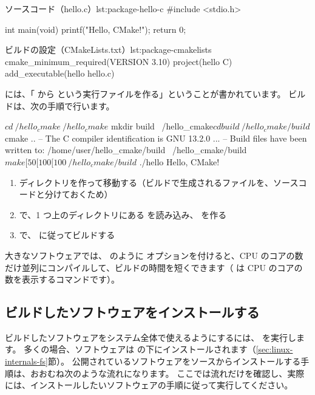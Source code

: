 \begin{codelisting}[style=cpp]{ソースコード（hello.c）}{lst:package-hello-c}
#include <stdio.h>

int main(void)
{
    printf("Hello, CMake!\n");
    return 0;
}
\end{codelisting}

\begin{codelisting}{ビルドの設定（CMakeLists.txt）}{lst:package-cmakelists}
cmake_minimum_required(VERSION 3.10)
project(hello C)
add_executable(hello hello.c)
\end{codelisting}

 には、「 から  という実行ファイルを作る」ということが書かれています。
ビルドは、次の手順で行います。

\begin{terminal}
$ cd ~/hello_cmake
~/hello_cmake$ mkdir build
~/hello_cmake$ cd build
~/hello_cmake/build$ cmake ..
-- The C compiler identification is GNU 13.2.0
...
-- Build files have been written to: /home/user/hello_cmake/build
~/hello_cmake/build$ make
[ 50%
[100%
[100%
~/hello_cmake/build$ ./hello
Hello, CMake!
\end{terminal}

\begin{enumerate}
  \item {} ディレクトリを作って移動する（ビルドで生成されるファイルを、ソースコードと分けておくため）
  \item {} で、1 つ上のディレクトリにある  を読み込み、 を作る
  \item {} で、 に従ってビルドする
\end{enumerate}

大きなソフトウェアでは、 のように  オプションを付けると、CPU のコアの数だけ並列にコンパイルして、ビルドの時間を短くできます（ は CPU のコアの数を表示するコマンドです）。

\subsection{ビルドしたソフトウェアをインストールする}

ビルドしたソフトウェアをシステム全体で使えるようにするには、 を実行します。
多くの場合、ソフトウェアは  の下にインストールされます（\ref{sec:linux-internals-fs}節）。
公開されているソフトウェアをソースからインストールする手順は、おおむね次のような流れになります。
ここでは流れだけを確認し、実際には、インストールしたいソフトウェアの手順に従って実行してください。

